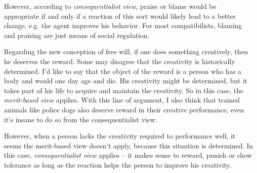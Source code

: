 However, according to \emph{consequentialist view}, praise or blame would be appropriate if and only if a reaction of this sort would likely lead to a better change, e.g. the agent improves his behavior. For most compatibilists, blaming and praising are just means of social regulation.

Regarding the new conception of free will, if one does something creatively, then he deserves the reward. Some may disagree that the creativity is historically determined. I'd like to say that the object of the reward is a person who has a body and would one day age and die. His creativity might be determined, but it takes part of his life to acquire and maintain the creativity. So in this case, the \emph{merit-based view} applies. With this line of argument, I also think that trained animals like police dogs also deserve reward in their creative performance, even it's insane to do so from the consequentialist view.

However, when a person lacks the creativity required to performance well, it seems the merit-based view doesn't apply, because this situation is determined. In this case, \emph{consequentialist view} applies -- it makes sense to reward, punish or show tolerance as long as the reaction helps the person to improve his creativity.




